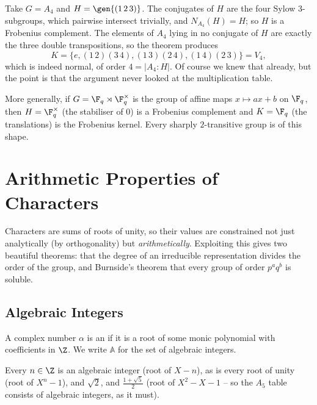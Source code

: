 \begin{example}
	Take $G = A_4$ and $H = \gen{(1\,2\,3)}$. The conjugates of $H$ are the four Sylow $3$-subgroups, which pairwise intersect trivially, and $N_{A_4}(H) = H$; so $H$ is a Frobenius complement. The elements of $A_4$ lying in no conjugate of $H$ are exactly the three double transpositions, so the theorem produces
	$$K = \{e, (1\,2)(3\,4),(1\,3)(2\,4),(1\,4)(2\,3)\} = V_4,$$
	which is indeed normal, of order $4 = |A_4:H|$. Of course we knew that already, but the point is that the argument never looked at the multiplication table.
\end{example}

\begin{example}
	More generally, if $G = \F_q\rtimes\F_q^\times$ is the group of affine maps $x\mapsto ax+b$ on $\F_q$, then $H = \F_q^\times$ (the stabiliser of $0$) is a Frobenius complement and $K = \F_q$ (the translations) is the Frobenius kernel. Every sharply $2$-transitive group is of this shape.
\end{example}

\section{Arithmetic Properties of Characters}

Characters are sums of roots of unity, so their values are constrained not just analytically (by orthogonality) but \emph{arithmetically}. Exploiting this gives two beautiful theorems: that the degree of an irreducible representation divides the order of the group, and Burnside's theorem that every group of order $p^aq^b$ is soluble.

\subsection{Algebraic Integers}

\begin{definition}
	A complex number $\alpha$ is an  if it is a root of some monic polynomial with coefficients in $\Z$. We write $\mathbb{A}$ for the set of algebraic integers.
\end{definition}

\begin{example}
	Every $n\in\Z$ is an algebraic integer (root of $X - n$), as is every root of unity (root of $X^n - 1$), and $\sqrt 2$, and $\frac{1+\sqrt5}{2}$ (root of $X^2 - X - 1$ -- so the $A_5$ table consists of algebraic integers, as it must).
\end{example}

